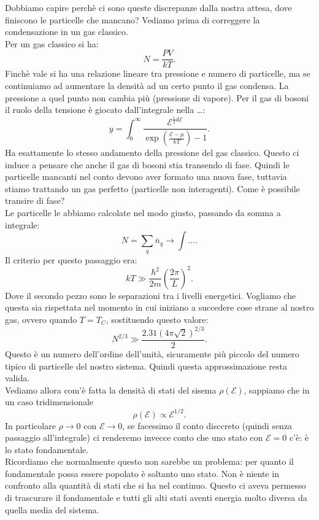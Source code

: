 Dobbiamo capire perchè ci sono queste discrepanze dalla nostra attesa, dove finiscono le particelle che mancano? Vediamo prima di correggere la condensazione in un gas classico.\\
Per un gas classico si ha:
\[
	N = \frac{PV}{kT}
.\] 
Finchè vale si ha una relazione lineare tra pressione e numero di particelle, ma se continuiamo ad aumentare la densità ad un certo punto il gas condensa. La pressione a quel punto non cambia più (pressione di vapore). Per il gas di bosoni il ruolo della tensione è giocato dall'integrale nella \ldots:
\[
	y =\int_{0}^{\infty} \frac{\mathcal{E} ^{\frac{1}{2}d\mathcal{E} }}{\exp\left( \frac{\mathcal{E} -\mu }{kT} \right)-1 } 
.\] 
Ha esattamente lo stesso andamento della pressione del gas classico. Questo ci induce a pensare che anche il gas di bosoni stia transendo di fase. Quindi le particelle mancanti nel conto devono aver formato una nuova fase, tuttavia stiamo trattando un gas perfetto (particelle non interagenti). Come è possibile transire di fase? \\
Le particelle le abbiamo calcolate nel modo giusto, passando da somma a integrale:
\[
	N = \sum_{q}^{} \overline{n}_{q} \to \int\ldots
.\] 
Il criterio per questo passaggio era:  \[
	kT \gg \frac{\hbar^2}{2m}\left( \frac{2\pi}{L} \right) ^2
.\] Dove il secondo pezzo sono le separazioni tra i livelli energetici. Vogliamo che questa sia rispettata nel momento in cui iniziano a succedere cose strane al nostro gas, ovvero quando $T = T_{C}$, sostituendo questo valore:
\[
	N^{2 /3} \gg \frac{2.31 \left( 4\pi\sqrt{2}  \right)^{2 /3}}{2}
.\] 
Questo è un numero dell'ordine dell'unità, sicuramente più piccolo del numero tipico di particelle del nostro sistema. Quindi questa approssimazione resta valida.\\
Vediamo allora com'è fatta la densità di stati del sisema $\rho ( \mathcal{E} ) $, sappiamo che in un caso tridimensionale  
\[
	\rho ( \mathcal{E} ) \propto \mathcal{E} ^{1 /2}
.\] 
In particolare $\rho \to 0$ con $\mathcal{E} \to 0$, se facessimo il conto disccreto (quindi senza passaggio all'integrale) ci renderemo invecce conto che uno stato con $\mathcal{E} = 0 $ c'è: è lo stato fondamentale. \\
Ricordiamo che normalmente questo non sarebbe un problema: per quanto il fondamentale possa essere popolato è soltanto uno stato. Non è niente in confronto alla quantità di stati che si ha nel continuo. Questo ci aveva permesso di trascurare il fondamentale e tutti gli alti stati aventi energia molto diversa da quella media del sistema.\\
